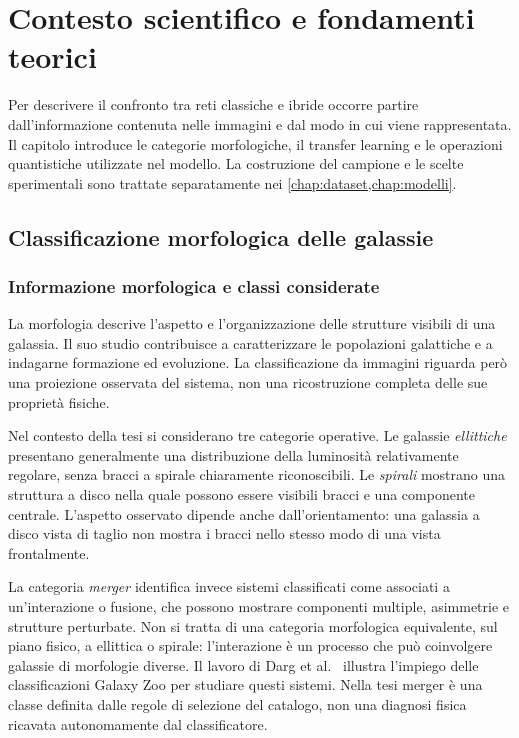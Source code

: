 \chapter{Contesto scientifico e fondamenti teorici}
\label{chap:fondamenti}

Per descrivere il confronto tra reti classiche e ibride occorre partire
dall'informazione contenuta nelle immagini e dal modo in cui viene
rappresentata. Il capitolo introduce le categorie morfologiche, il
transfer learning e le operazioni quantistiche utilizzate nel modello.
La costruzione del campione e le scelte sperimentali sono trattate
separatamente nei \cref{chap:dataset,chap:modelli}.

\section{Classificazione morfologica delle galassie}
\label{sec:fond-morfologia}

\subsection{Informazione morfologica e classi considerate}

La morfologia descrive l'aspetto e l'organizzazione delle strutture visibili
di una galassia. Il suo studio contribuisce a caratterizzare le popolazioni
galattiche e a indagarne formazione ed evoluzione. La classificazione da
immagini riguarda però una proiezione osservata del sistema, non una
ricostruzione completa delle sue proprietà fisiche.

Nel contesto della tesi si considerano tre categorie operative. Le galassie
\emph{ellittiche} presentano generalmente una distribuzione della luminosità
relativamente regolare, senza bracci a spirale chiaramente riconoscibili.
Le \emph{spirali} mostrano una struttura a disco nella quale possono essere
visibili bracci e una componente centrale. L'aspetto osservato dipende
anche dall'orientamento: una galassia a disco vista di taglio non mostra
i bracci nello stesso modo di una vista frontalmente.

La categoria \emph{merger} identifica invece sistemi classificati come
associati a un'interazione o fusione, che possono mostrare componenti
multiple, asimmetrie e strutture perturbate. Non si tratta di una categoria
morfologica equivalente, sul piano fisico, a ellittica o spirale:
l'interazione è un processo che può coinvolgere galassie di morfologie
diverse. Il lavoro di Darg et al.~\cite{darg2010mergers} illustra l'impiego
delle classificazioni Galaxy Zoo per studiare questi sistemi. Nella tesi
merger è una classe definita dalle regole di selezione del catalogo, non
una diagnosi fisica ricavata autonomamente dal classificatore.

